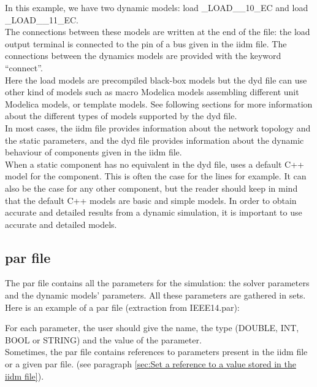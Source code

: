 \documentclass[a4paper, 12pt]{report}
\begin{document}
In this example, we have two dynamic models: load \_LOAD\_\_10\_EC and load \_LOAD\_\_11\_EC. \\

The connections between these models are written at the end of the file: the load output terminal is connected to the pin of a bus given in the iidm file. The connections between the dynamics models are provided with the keyword ``connect''. \\

Here the load models are precompiled black-box models but the dyd file can use other kind of models such as macro Modelica models assembling different unit Modelica models, or template models. See following sections for more information about the different types of models supported by the dyd file. \\

In most cases, the iidm file provides information about the network topology and the static parameters, and the dyd file provides information about the dynamic behaviour of components given in the iidm file. \\

When a static component has no equivalent in the dyd file, \Dynawo uses a default C++ model for the component. This is often the case for the lines for example. It can also be the case for any other component, but the reader should keep in mind that the default C++ models are basic and simple models. In order to obtain accurate and detailed results from a dynamic simulation, it is important to use accurate and detailed models.

\subsection{par file}

The par file contains all the parameters for the simulation: the solver parameters and the dynamic models' parameters. All these parameters are gathered in sets. \\

Here is an example of a par file (extraction from IEEE14.par):


For each parameter, the user should give the name, the type (DOUBLE, INT, BOOL or STRING) and the value of the parameter. \\

Sometimes, the par file contains references to parameters present in the iidm file or a given par file. (see paragraph \ref{sec:Set a reference to a value stored in the iidm file}).
\end{document}
